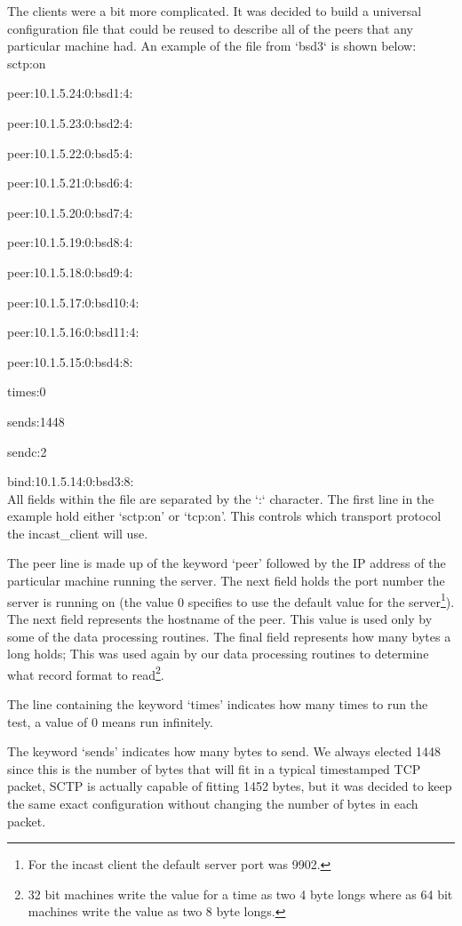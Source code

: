 \documentclass[12pt]{article}
\begin{document}
The clients were a bit more complicated. It was decided to build a universal 
configuration file that could be reused to describe all of the peers that any
particular machine had. An example of the file from `bsd3` is shown below:
\\

sctp:on

peer:10.1.5.24:0:bsd1:4:

peer:10.1.5.23:0:bsd2:4:

peer:10.1.5.22:0:bsd5:4:

peer:10.1.5.21:0:bsd6:4:

peer:10.1.5.20:0:bsd7:4:

peer:10.1.5.19:0:bsd8:4:

peer:10.1.5.18:0:bsd9:4:

peer:10.1.5.17:0:bsd10:4:

peer:10.1.5.16:0:bsd11:4:

peer:10.1.5.15:0:bsd4:8:

times:0

sends:1448

sendc:2

bind:10.1.5.14:0:bsd3:8:
\\

All fields within the file are separated by the `:` character.
The first line in the example hold either `sctp:on' or `tcp:on'. This controls which transport protocol
the incast\_client will use. 

The peer line is made up of the keyword `peer' followed by the IP address of the particular
machine running the server. The next field holds the port  number the server is
running on (the value 0 specifies to use the default value for the server\footnote{For the incast
client the default server port was 9902.}). The next field represents the hostname of the peer. This value 
is used only by some of the data processing routines. The final field represents how many bytes a
long holds; This was used again by our data processing routines to determine what record format
to read\footnote{32 bit machines write the value for a time as two 4 byte longs where as 64 bit machines
write the value as two 8 byte longs.}.

The line containing the keyword `times' indicates how many times to run the test, a value of 0
means run infinitely.

The keyword `sends' indicates how many bytes to send. We always elected 1448 since this is
the number of bytes that will fit in a typical timestamped TCP packet, SCTP is actually capable
of fitting 1452 bytes, but it was decided to keep the same exact configuration without changing
the number of bytes in each packet.
\end{document}
